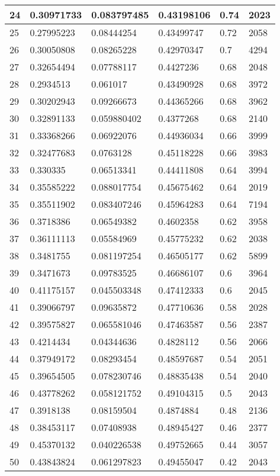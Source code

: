 \begin{longtable}{|l|l|l|l|l|l|}
24 & 0.30971733 & 0.083797485 & 0.43198106 & 0.74 & 2023 \\ \hline 
25 & 0.27995223 & 0.08444254 & 0.43499747 & 0.72 & 2058 \\ \hline 
26 & 0.30050808 & 0.08265228 & 0.42970347 & 0.7 & 4294 \\ \hline 
27 & 0.32654494 & 0.07788117 & 0.4427236 & 0.68 & 2048 \\ \hline 
28 & 0.2934513 & 0.061017 & 0.43490928 & 0.68 & 3972 \\ \hline 
29 & 0.30202943 & 0.09266673 & 0.44365266 & 0.68 & 3962 \\ \hline 
30 & 0.32891133 & 0.059880402 & 0.4377268 & 0.68 & 2140 \\ \hline 
31 & 0.33368266 & 0.06922076 & 0.44936034 & 0.66 & 3999 \\ \hline 
32 & 0.32477683 & 0.0763128 & 0.45118228 & 0.66 & 3983 \\ \hline 
33 & 0.330335 & 0.06513341 & 0.44411808 & 0.64 & 3994 \\ \hline 
34 & 0.35585222 & 0.088017754 & 0.45675462 & 0.64 & 2019 \\ \hline 
35 & 0.35511902 & 0.083407246 & 0.45964283 & 0.64 & 7194 \\ \hline 
36 & 0.3718386 & 0.06549382 & 0.4602358 & 0.62 & 3958 \\ \hline 
37 & 0.36111113 & 0.05584969 & 0.45775232 & 0.62 & 2038 \\ \hline 
38 & 0.3481755 & 0.081197254 & 0.46505177 & 0.62 & 5899 \\ \hline 
39 & 0.3471673 & 0.09783525 & 0.46686107 & 0.6 & 3964 \\ \hline 
40 & 0.41175157 & 0.045503348 & 0.47412333 & 0.6 & 2045 \\ \hline 
41 & 0.39066797 & 0.09635872 & 0.47710636 & 0.58 & 2028 \\ \hline 
42 & 0.39575827 & 0.065581046 & 0.47463587 & 0.56 & 2387 \\ \hline 
43 & 0.4214434 & 0.04344636 & 0.4828112 & 0.56 & 2066 \\ \hline 
44 & 0.37949172 & 0.08293454 & 0.48597687 & 0.54 & 2051 \\ \hline 
45 & 0.39654505 & 0.078230746 & 0.48835438 & 0.54 & 2040 \\ \hline 
46 & 0.43778262 & 0.058121752 & 0.49104315 & 0.5 & 2043 \\ \hline 
47 & 0.3918138 & 0.08159504 & 0.4874884 & 0.48 & 2136 \\ \hline 
48 & 0.38453117 & 0.07408938 & 0.48945427 & 0.46 & 2377 \\ \hline 
49 & 0.45370132 & 0.040226538 & 0.49752665 & 0.44 & 3057 \\ \hline 
50 & 0.43843824 & 0.061297823 & 0.49455047 & 0.42 & 2043 \\ \hline 
\end{longtable}